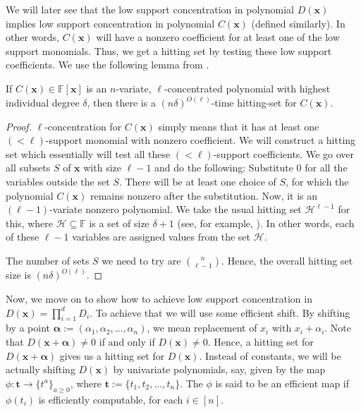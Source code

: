 \documentclass[final,oneeqnum, onethmnum, onefignum]{siamltex1213}
\newcommand{\F}{\mathbb F}
\newcommand{\degree}{\delta} %
\newcommand{\Hit}{\mathcal{H}} %
\newcommand{\x}{\mathbf{x}}
\begin{document}
We will later see that the low support concentration in
polynomial $D(\x)$ implies low support concentration in polynomial $C(\x)$ 
(defined similarly).
In other words, $C(\x)$ will have 
a nonzero coefficient for at least one of the low support monomials. 
Thus, we get a hitting set by testing these low support coefficients.
We use the following lemma from \cite{ASS13}.

\begin{lemma}
\label{lem:hsFromlConc}%
If $C(\x) \in \F[\x]$ is an $n$-variate, $\ell$-concentrated polynomial 
with highest individual degree $\degree$, 
then there is a $(n \degree)^{O(\ell)}$-time hitting-set for $C(\x)$.
\end{lemma}
\begin{proof}
$\ell$-concentration for $C(\x)$ simply means that 
it has at least one $(< \ell)$-support monomial
with nonzero coefficient. 
We will construct a hitting set which essentially will test all these 
$(< \ell)$-support coefficients. 
We go over all subsets $S$ of $\x$ with size $\ell-1$ and do the following:
Substitute $0$ for all the variables outside the set $S$.
There will be at least one choice of $S$, for which the polynomial $C(\x)$
remains nonzero after the substitution.
Now, it is an $(\ell -1)$-variate nonzero polynomial. 
We take the usual hitting set $\Hit^{\ell-1}$ for this, where
$\Hit \subseteq \F$ is a set of size $\degree +1$ (see, for example, \cite[Fact 4.1]{SY10}).
In other words, each of these $\ell -1 $ variables are assigned values from the set $\Hit$.

The number of sets $S$ we need to try are ${n}\choose{\ell -1}$. 
Hence, the overall hitting set size is $(n \degree)^{O(\ell)}$.
\end{proof}

Now, we move on to show how to achieve low support 
concentration in $ D(\x) = \prod_{i=1}^{d} D_i $.
To achieve that we will use some efficient shift.
By shifting by a point $\mathbf{\alpha} := (\alpha_1, \alpha_2, \dots, \alpha_n)$,
we mean replacement of $x_i$ with $x_i + \alpha_i$.
Note that $D(\x + \mathbf{\alpha} ) \neq 0$
if and only if $D(\x) \neq 0$.
Hence, a hitting set for $D(\x + \mathbf{\alpha})$
gives us a hitting set for $D(\x)$. 
Instead of constants, we will be actually shifting $D(\x)$ by univariate polynomials,
say, given by the map $\phi \colon \mathbf{t} \to \{t^a\}_{a \geq 0} $, where
$\mathbf{t} := \{t_1, t_2, \dots, t_n \} $.
The $\phi$ is said to be an efficient map if  
 $\phi(t_i)$ is efficiently computable, for each $i \in [n]$.
\end{document}
